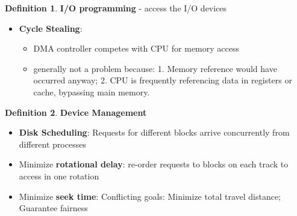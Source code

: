 \documentclass[11pt,a4paper]{article}
\theoremstyle{definition}
\newtheorem{definition}{Definition}[section]
\newenvironment{myitemize}
{ \begin{itemize}
    \setlength{\itemsep}{5pt}
    \setlength{\parskip}{0pt}
    \setlength{\parsep}{0pt}     }
{ \end{itemize}                  }
\begin{document}
\begin{definition}{\textbf{I/O programming} - access the I/O devices}
\begin{myitemize}
\begin{myitemize}
\begin{tcolorbox}
			\end{tcolorbox}
						\begin{myitemize}
				\item Writing opcode triggers DMA controller
				\item DMA controller issues interrupt after n chars in memory
			\end{myitemize}
			\item \textbf{Cycle Stealing}: 
			\begin{myitemize}
				\item DMA controller competes with CPU for memory access 
				\item generally not a problem because: 1. Memory reference would have occurred anyway; 2. CPU is frequently referencing data in registers or cache, bypassing main memory.
			\end{myitemize}
		\end{myitemize}
	\end{myitemize}
\end{definition}

\begin{definition}{\textbf{Device Management}}
	\begin{myitemize}
		\item \textbf{Disk Scheduling}: Requests for different blocks arrive concurrently from different processes
		\item Minimize \textbf{rotational delay}: re-order requests to blocks on each track to access in one rotation
		\item Minimize \textbf{seek time}: Conflicting goals: Minimize total travel distance; Guarantee fairness
	\end{myitemize}
\end{definition}
\end{document}
